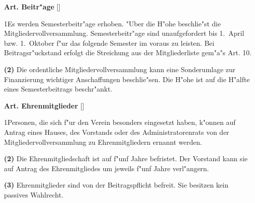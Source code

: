 \documentclass[12pt]{article}
\newcommand{\Satz}[2]{

\begin{samepage}
{\bf (#1)} #2
\end{samepage}
}
\newenvironment{Artikel}[2]{
\bigskip \centerline{{\bf Art. #1} [#2]}
\nopagebreak
}{
}
\begin{document}

\begin{Artikel}{8}{Beitr"age}

\Satz{1}{Es werden Semesterbeitr"age erhoben. "Uber die H"ohe beschlie"st die 
Mitgliedervollversammlung. Semesterbeitr"age sind 
unaufgefordert bis \mbox{1. April} bzw. \mbox{1. Oktober} f"ur das folgende 
Semester im voraus zu leisten. Bei Beitragsr"uckstand erfolgt die Streichung 
aus der Mitgliederliste gem"a"s Art. 10.}

\Satz{2}{Die ordentliche Mitgliedervollversammlung kann eine 
Sonderumlage zur Finanzierung wichtiger Anschaffungen beschlie"sen. 
Die H"ohe ist auf die H"alfte eines Semesterbeitrags beschr"ankt.}

\end{Artikel}

\begin{Artikel}{9}{Ehrenmitglieder}

\Satz{1}{Personen, die sich f"ur den Verein besonders eingesetzt haben,
k"onnen auf Antrag eines Hauses, des Vorstands oder des Administratorenrats
von der Mitgliedervollversammlung zu Ehrenmitgliedern ernannt werden.}

\Satz{2}{Die Ehrenmitgliedschaft ist auf f"unf Jahre befristet. Der
Vorstand kann sie auf Antrag des Ehrenmitgliedes um jeweils f"unf Jahre
verl"angern.}

\Satz{3}{Ehrenmitglieder sind von der Beitragspflicht befreit. 
Sie besitzen kein passives Wahlrecht.}

\end{Artikel}
\end{document}
